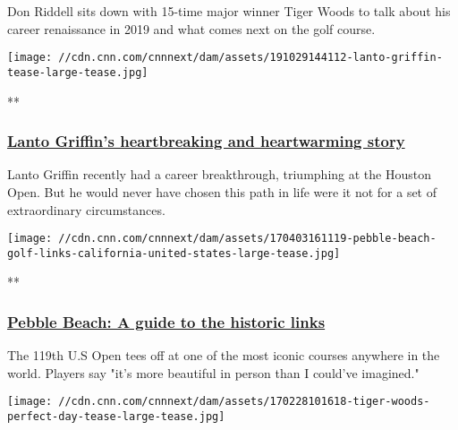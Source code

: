 Don Riddell sits down with 15-time major winner Tiger Woods to talk
about his career renaissance in 2019 and what comes next on the golf
course.

\href{/videos/sports/2019/10/29/lanto-griffin-houston-open-victory-life-story-pga-tour-golf-spt-intl.cnn}{}

\texttt{[image: //cdn.cnn.com/cnnnext/dam/assets/191029144112-lanto-griffin-tease-large-tease.jpg]}

**

\hypertarget{lanto-griffins-heartbreaking-and-heartwarming-story}{%
\subsubsection{\texorpdfstring{\href{/videos/sports/2019/10/29/lanto-griffin-houston-open-victory-life-story-pga-tour-golf-spt-intl.cnn}{Lanto
Griffin's heartbreaking and heartwarming
story}}{Lanto Griffin's heartbreaking and heartwarming story}}\label{lanto-griffins-heartbreaking-and-heartwarming-story}}

Lanto Griffin recently had a career breakthrough, triumphing at the
Houston Open. But he would never have chosen this path in life were it
not for a set of extraordinary circumstances.

\href{/videos/sports/2019/06/13/pebble-beach-guide-2019-us-open-golf-spt-intl.cnn}{}

\texttt{[image: //cdn.cnn.com/cnnnext/dam/assets/170403161119-pebble-beach-golf-links-california-united-states-large-tease.jpg]}

**

\hypertarget{pebble-beach-a-guide-to-the-historic-links}{%
\subsubsection{\texorpdfstring{\href{/videos/sports/2019/06/13/pebble-beach-guide-2019-us-open-golf-spt-intl.cnn}{Pebble
Beach: A guide to the historic
links}}{Pebble Beach: A guide to the historic links}}\label{pebble-beach-a-guide-to-the-historic-links}}

The 119th U.S Open tees off at one of the most iconic courses anywhere
in the world. Players say "it's more beautiful in person than I could've
imagined."

\href{/videos/sports/2017/02/28/tiger-woods-perfect-day-dubai-caddyshack-earl-woods-oatmeal-living-golf-orig.cnn}{}

\texttt{[image: //cdn.cnn.com/cnnnext/dam/assets/170228101618-tiger-woods-perfect-day-tease-large-tease.jpg]}

